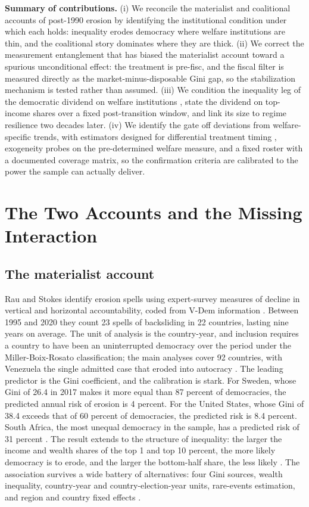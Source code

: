 \documentclass[11pt,letterpaper]{article}
\begin{document}
\textbf{Summary of contributions.} (i) We reconcile the materialist and coalitional accounts of post-1990 erosion by identifying the institutional condition under which each holds: inequality erodes democracy where welfare institutions are thin, and the coalitional story dominates where they are thick. (ii) We correct the measurement entanglement that has biased the materialist account toward a spurious unconditional effect: the treatment is pre-fisc, and the fiscal filter is measured directly as the market-minus-disposable Gini gap, so the stabilization mechanism is tested rather than assumed. (iii) We condition the inequality leg of the democratic dividend on welfare institutions \citep{AcemogluNaidu2015}, state the dividend on top-income shares over a fixed post-transition window, and link its size to regime resilience two decades later. (iv) We identify the gate off deviations from welfare-specific trends, with estimators designed for differential treatment timing \citep{Callaway2021, SunAbraham2021}, exogeneity probes on the pre-determined welfare measure, and a fixed roster with a documented coverage matrix, so the confirmation criteria are calibrated to the power the sample can actually deliver.

\section{The Two Accounts and the Missing Interaction}

\subsection{The materialist account}

Rau and Stokes identify erosion spells using expert-survey measures of decline in vertical and horizontal accountability, coded from V-Dem information \citep{RauStokes2025}. Between 1995 and 2020 they count 23 spells of backsliding in 22 countries, lasting nine years on average. The unit of analysis is the country-year, and inclusion requires a country to have been an uninterrupted democracy over the period under the Miller-Boix-Rosato classification; the main analyses cover 92 countries, with Venezuela the single admitted case that eroded into autocracy \citep{RauStokes2025, BoixMiller2013}. The leading predictor is the Gini coefficient, and the calibration is stark. For Sweden, whose Gini of 26.4 in 2017 makes it more equal than 87 percent of democracies, the predicted annual risk of erosion is 4 percent. For the United States, whose Gini of 38.4 exceeds that of 60 percent of democracies, the predicted risk is 8.4 percent. South Africa, the most unequal democracy in the sample, has a predicted risk of 31 percent \citep{RauStokes2025}. The result extends to the structure of inequality: the larger the income and wealth shares of the top 1 and top 10 percent, the more likely democracy is to erode, and the larger the bottom-half share, the less likely \citep{RauStokes2025}. The association survives a wide battery of alternatives: four Gini sources, wealth inequality, country-year and country-election-year units, rare-events estimation, and region and country fixed effects \citep{RauStokes2025}.
\end{document}
